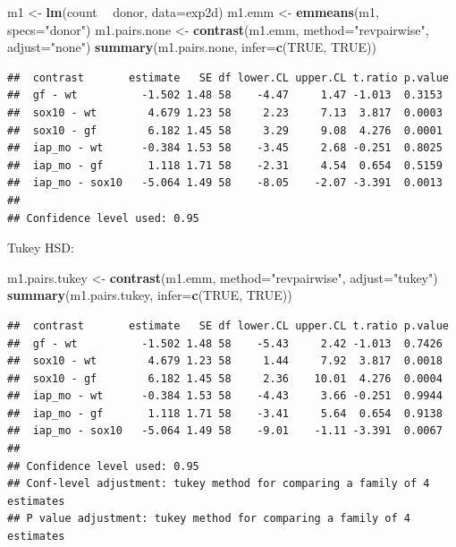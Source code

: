 \documentclass[]{book}
\newenvironment{Shaded}{\begin{snugshade}}{\end{snugshade}}
\newcommand{\KeywordTok}[1]{\textcolor[rgb]{0.13,0.29,0.53}{\textbf{#1}}}
\newcommand{\DataTypeTok}[1]{\textcolor[rgb]{0.13,0.29,0.53}{#1}}
\newcommand{\StringTok}[1]{\textcolor[rgb]{0.31,0.60,0.02}{#1}}
\newcommand{\OtherTok}[1]{\textcolor[rgb]{0.56,0.35,0.01}{#1}}
\newcommand{\OperatorTok}[1]{\textcolor[rgb]{0.81,0.36,0.00}{\textbf{#1}}}
\newcommand{\NormalTok}[1]{#1}
\begin{document}
\begin{Shaded}
\begin{Highlighting}[]
\NormalTok{m1 <-}\StringTok{ }\KeywordTok{lm}\NormalTok{(count }\OperatorTok{~}\StringTok{ }\NormalTok{donor, }\DataTypeTok{data=}\NormalTok{exp2d)}
\NormalTok{m1.emm <-}\StringTok{ }\KeywordTok{emmeans}\NormalTok{(m1, }\DataTypeTok{specs=}\StringTok{"donor"}\NormalTok{)}
\NormalTok{m1.pairs.none <-}\StringTok{ }\KeywordTok{contrast}\NormalTok{(m1.emm, }\DataTypeTok{method=}\StringTok{"revpairwise"}\NormalTok{, }\DataTypeTok{adjust=}\StringTok{"none"}\NormalTok{)}
\KeywordTok{summary}\NormalTok{(m1.pairs.none, }\DataTypeTok{infer=}\KeywordTok{c}\NormalTok{(}\OtherTok{TRUE}\NormalTok{, }\OtherTok{TRUE}\NormalTok{))}
\end{Highlighting}
\end{Shaded}

\begin{verbatim}
##  contrast       estimate   SE df lower.CL upper.CL t.ratio p.value
##  gf - wt          -1.502 1.48 58    -4.47     1.47 -1.013  0.3153 
##  sox10 - wt        4.679 1.23 58     2.23     7.13  3.817  0.0003 
##  sox10 - gf        6.182 1.45 58     3.29     9.08  4.276  0.0001 
##  iap_mo - wt      -0.384 1.53 58    -3.45     2.68 -0.251  0.8025 
##  iap_mo - gf       1.118 1.71 58    -2.31     4.54  0.654  0.5159 
##  iap_mo - sox10   -5.064 1.49 58    -8.05    -2.07 -3.391  0.0013 
## 
## Confidence level used: 0.95
\end{verbatim}

Tukey HSD:

\begin{Shaded}
\begin{Highlighting}[]
\NormalTok{m1.pairs.tukey <-}\StringTok{ }\KeywordTok{contrast}\NormalTok{(m1.emm, }\DataTypeTok{method=}\StringTok{"revpairwise"}\NormalTok{, }\DataTypeTok{adjust=}\StringTok{"tukey"}\NormalTok{)}
\KeywordTok{summary}\NormalTok{(m1.pairs.tukey, }\DataTypeTok{infer=}\KeywordTok{c}\NormalTok{(}\OtherTok{TRUE}\NormalTok{, }\OtherTok{TRUE}\NormalTok{))}
\end{Highlighting}
\end{Shaded}

\begin{verbatim}
##  contrast       estimate   SE df lower.CL upper.CL t.ratio p.value
##  gf - wt          -1.502 1.48 58    -5.43     2.42 -1.013  0.7426 
##  sox10 - wt        4.679 1.23 58     1.44     7.92  3.817  0.0018 
##  sox10 - gf        6.182 1.45 58     2.36    10.01  4.276  0.0004 
##  iap_mo - wt      -0.384 1.53 58    -4.43     3.66 -0.251  0.9944 
##  iap_mo - gf       1.118 1.71 58    -3.41     5.64  0.654  0.9138 
##  iap_mo - sox10   -5.064 1.49 58    -9.01    -1.11 -3.391  0.0067 
## 
## Confidence level used: 0.95 
## Conf-level adjustment: tukey method for comparing a family of 4 estimates 
## P value adjustment: tukey method for comparing a family of 4 estimates
\end{verbatim}
\end{document}
